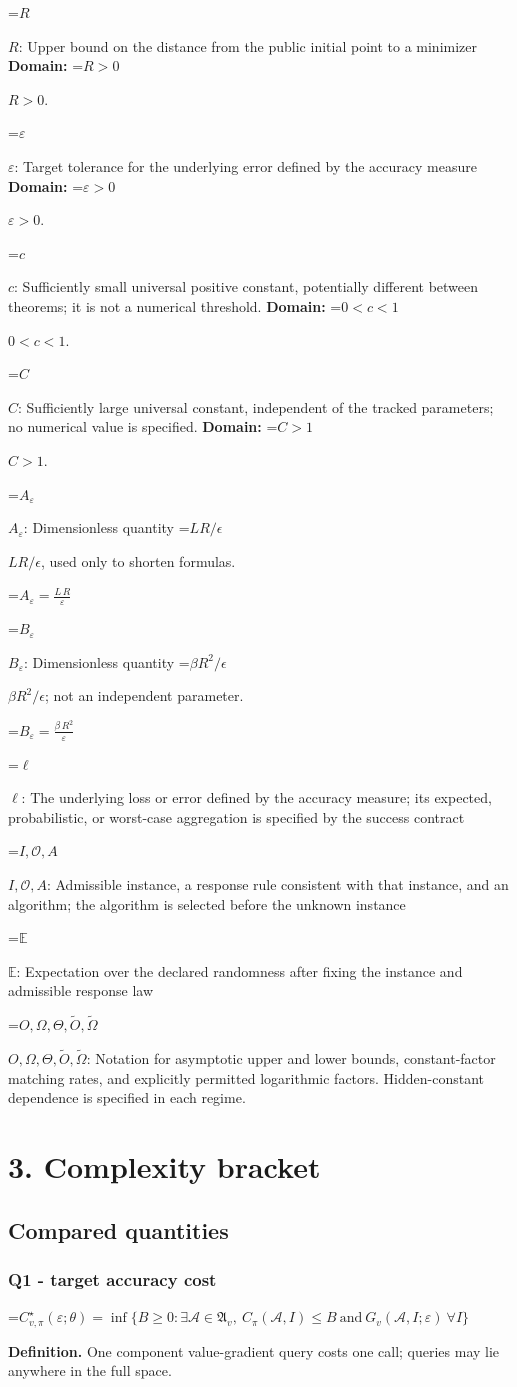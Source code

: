 \documentclass[10pt,a4paper]{article}
\newcommand{\AtlasMath}[1]{\par\begingroup\centering\setbox0=\hbox{$\displaystyle #1$}\ifdim\wd0>1.4\linewidth\typeout{ATLAS WIDE FORMULA: \the\wd0}\fi\ifdim\wd0>\linewidth\resizebox{\linewidth}{!}{\box0}\else\box0\fi\par\endgroup}
\newcommand{\AtlasInlineMath}[1]{\begingroup\setbox0=\hbox{$#1$}\ifdim\wd0>.4\linewidth\endgroup\AtlasMath{#1}\else\endgroup$#1$\fi}
\begin{document}
\AtlasInlineMath{R}: Upper bound on the distance from the public initial point to a minimizer \textbf{Domain:} \AtlasInlineMath{R>0}.

\AtlasInlineMath{\varepsilon}: Target tolerance for the underlying error defined by the accuracy measure \textbf{Domain:} \AtlasInlineMath{\varepsilon>0}.

\AtlasInlineMath{c}: Sufficiently small universal positive constant, potentially different between theorems; it is not a numerical threshold. \textbf{Domain:} \AtlasInlineMath{0<c<1}.

\AtlasInlineMath{C}: Sufficiently large universal constant, independent of the tracked parameters; no numerical value is specified. \textbf{Domain:} \AtlasInlineMath{C>1}.

\AtlasInlineMath{A_\varepsilon}: Dimensionless quantity \AtlasInlineMath{LR/\epsilon}, used only to shorten formulas.


\AtlasMath{A_\varepsilon=\frac{L\,R}{\varepsilon}}


\AtlasInlineMath{B_\varepsilon}: Dimensionless quantity \AtlasInlineMath{\beta R^2/\epsilon}; not an independent parameter.


\AtlasMath{B_\varepsilon=\frac{\beta\,{R}^{2}}{\varepsilon}}


\AtlasInlineMath{\ell}: The underlying loss or error defined by the accuracy measure; its expected, probabilistic, or worst-case aggregation is specified by the success contract

\AtlasInlineMath{I,\mathcal{O},A}: Admissible instance, a response rule consistent with that instance, and an algorithm; the algorithm is selected before the unknown instance

\AtlasInlineMath{\mathbb{E}}: Expectation over the declared randomness after fixing the instance and admissible response law

\AtlasInlineMath{O,\Omega,\Theta,\widetilde{O},\widetilde\Omega}: Notation for asymptotic upper and lower bounds, constant-factor matching rates, and explicitly permitted logarithmic factors. Hidden-constant dependence is specified in each regime.

\section{3. Complexity bracket}
\subsection{Compared quantities}
\subsubsection{Q1 - target accuracy cost}
\AtlasMath{C^\star_{v,\pi}(\varepsilon;\theta)=\inf\{B\ge0:\exists\mathcal A\in\mathfrak A_v,\ C_\pi(\mathcal A,I)\le B\ \text{and}\ G_v(\mathcal A,I;\varepsilon)\ \forall I\}}
\textbf{Definition.} One component value-gradient query costs one call; queries may lie anywhere in the full space.
\end{document}
